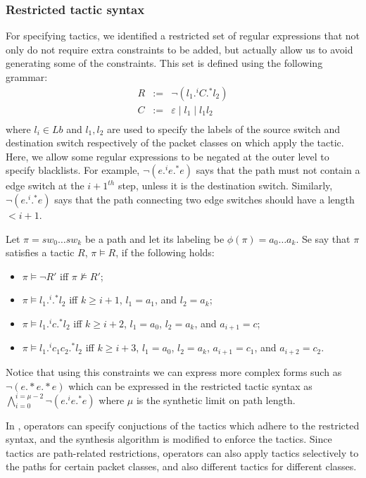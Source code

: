 \subsubsection{Restricted tactic syntax} 
For specifying tactics, we identified a restricted set of regular expressions
 that not only do not require extra constraints to be added,
but actually allow us to avoid generating some of the constraints. 
This set is defined using the following grammar:
$$\begin{array}{rcl}
R  &  :=  &  \neg (l_1 .^i C .^* l_2) \\
C  &  :=  &  \varepsilon \mid l_1 \mid l_1 l_2\\
\end{array}$$
where $l_i\in Lb$ and $l_1, l_2$ are used to specify the labels of the source switch 
and destination switch respectively of the packet classes on which apply the tactic. 
Here, we allow some regular expressions to be negated at the outer level to specify blacklists. For example, $\neg (e .^i e .^* e)$ says that the path must not contain a edge switch at the $i+1^{th}$ step, unless it is the destination switch. 
Similarly, $\neg (e .^i .^* e)$ says that the path connecting two edge switches should have a length $ < i + 1$. 

Let $\pi = sw_0\ldots sw_k$ be a path and 
let its labeling be $\phi(\pi)= a_0\ldots a_k$.
Se say that $\pi$ satisfies a tactic $R$, $\pi\vDash R$, if the following
holds:
\begin{itemize}
\item $\pi \vDash \neg R'$ iff $\pi \not\vDash R'$;
\item $\pi \vDash  l_1 .^i .^* l_2$ iff $k\geq i+1$, $l_1= a_1$, and $l_2= a_k$; 
\item $\pi \vDash  l_1 .^i c.^* l_2$ iff $k\geq i+2$, $l_1= a_0$, $l_2= a_k$, and $a_{i+1}=c$;
\item $\pi \vDash  l_1 .^i c_1 c_2.^* l_2$ iff $k\geq i+3$, $l_1= a_0$, $l_2= a_k$, $a_{i+1}=c_1$, and $a_{i+2}=c_2$.
\end{itemize}

Notice that using this constraints we can express more complex forms such as
$\neg (e .* e .* e)$ which can be expressed in the restricted tactic syntax 
as $\bigwedge \limits_{i=0}^{i=\mu-2} \neg (e .^i e .^* e)$ where $\mu$ is the synthetic limit on path length. 

In \Name, operators can specify conjuctions of the tactics which adhere to the restricted syntax, and the synthesis algorithm is modified to enforce the tactics. Since tactics are path-related restrictions, operators can also apply tactics selectively to the paths for certain packet classes, and also different tactics for different classes. 


